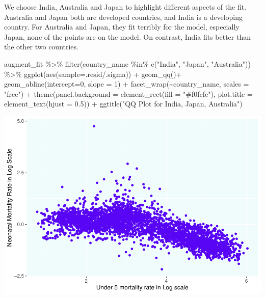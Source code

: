 \documentclass[
]{article}
\newenvironment{Shaded}{\begin{snugshade}}{\end{snugshade}}
\newcommand{\AttributeTok}[1]{\textcolor[rgb]{0.77,0.63,0.00}{#1}}
\newcommand{\DecValTok}[1]{\textcolor[rgb]{0.00,0.00,0.81}{#1}}
\newcommand{\FloatTok}[1]{\textcolor[rgb]{0.00,0.00,0.81}{#1}}
\newcommand{\FunctionTok}[1]{\textcolor[rgb]{0.00,0.00,0.00}{#1}}
\newcommand{\NormalTok}[1]{#1}
\newcommand{\SpecialCharTok}[1]{\textcolor[rgb]{0.00,0.00,0.00}{#1}}
\newcommand{\StringTok}[1]{\textcolor[rgb]{0.31,0.60,0.02}{#1}}
\begin{document}
We choose India, Australia and Japan to highlight different aspects of
the fit. Australia and Japan both are developed countries, and India is
a developing country. For Australia and Japan, they fit terribly for the
model, especially Japan, none of the points are on the model. On
contrast, India fits better than the other two countries.

\begin{Shaded}
\begin{Highlighting}[]
\NormalTok{augment\_fit }\SpecialCharTok{\%\textgreater{}\%} 
  \FunctionTok{filter}\NormalTok{(country\_name }\SpecialCharTok{\%in\%} \FunctionTok{c}\NormalTok{(}\StringTok{"India"}\NormalTok{, }\StringTok{"Japan"}\NormalTok{, }\StringTok{"Australia"}\NormalTok{)) }\SpecialCharTok{\%\textgreater{}\%} 
  \FunctionTok{ggplot}\NormalTok{(}\FunctionTok{aes}\NormalTok{(}\AttributeTok{sample=}\NormalTok{.resid}\SpecialCharTok{/}\NormalTok{.sigma)) }\SpecialCharTok{+}
  \FunctionTok{geom\_qq}\NormalTok{()}\SpecialCharTok{+}
  \FunctionTok{geom\_abline}\NormalTok{(}\AttributeTok{intercept=}\DecValTok{0}\NormalTok{, }\AttributeTok{slope =} \DecValTok{1}\NormalTok{) }\SpecialCharTok{+}
  \FunctionTok{facet\_wrap}\NormalTok{(}\SpecialCharTok{\textasciitilde{}}\NormalTok{country\_name, }\AttributeTok{scales =} \StringTok{"free"}\NormalTok{) }\SpecialCharTok{+}
  \FunctionTok{theme}\NormalTok{(}\AttributeTok{panel.background =} \FunctionTok{element\_rect}\NormalTok{(}\AttributeTok{fill =} \StringTok{"\#f0fcfc"}\NormalTok{),}
        \AttributeTok{plot.title =} \FunctionTok{element\_text}\NormalTok{(}\AttributeTok{hjust =} \FloatTok{0.5}\NormalTok{)) }\SpecialCharTok{+}
  \FunctionTok{ggtitle}\NormalTok{(}\StringTok{"QQ Plot for India, Japan, Australia"}\NormalTok{)}
\end{Highlighting}
\end{Shaded}

\includegraphics{A2_files/figure-latex/unnamed-chunk-9-1.pdf}
\end{document}
